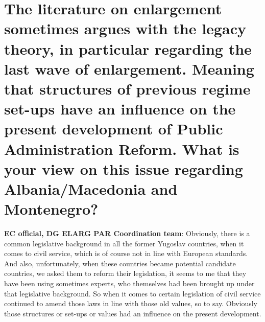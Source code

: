 \section{The literature on enlargement sometimes argues with the legacy theory, in particular regarding the last wave of enlargement. Meaning that structures of previous regime set-ups have an influence on the present development of Public Administration Reform. What is your view on this issue regarding Albania/Macedonia and Montenegro? }
\label{sec:montenegro1}
\textbf{EC official, DG ELARG PAR Coordination team}: Obviously, there is a common legislative background in all the former Yugoslav countries, when it comes to civil service, which is of course not in line with European standards. And also, unfortunately, when these countries became potential candidate countries, we asked them to reform their legislation, it seems to me that they have been using sometimes experts, who themselves had been brought up under that legislative background. So when it comes to certain legislation of civil service continued to amend those laws in line with those old values, so to say. Obviously those structures or set-ups or values had an influence on the present development. \\
